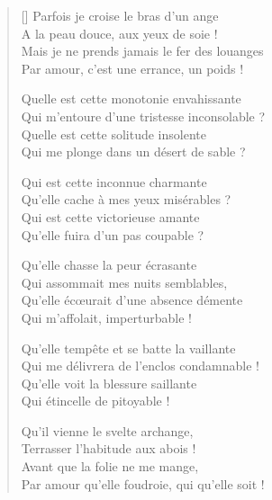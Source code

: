 \settowidth{\versewidth}{Qu'elle râle, se fasse entendre, mon introuvable !}
\begin{verse}[\versewidth]
Parfois je croise le bras d'un ange \\
A la peau douce, aux yeux de soie ! \\
Mais je ne prends jamais le fer des louanges \\
Par amour, c'est une errance, un poids !

Quelle est cette monotonie envahissante \\
Qui m'entoure d'une tristesse inconsolable ? \\
Quelle est cette solitude insolente \\
Qui me plonge dans un désert de sable ?

Qui est cette inconnue charmante \\
Qu'elle cache à mes yeux misérables ? \\
Qui est cette victorieuse amante \\
Qu'elle fuira d'un pas coupable ?

Qu'elle chasse la peur écrasante \\
Qui assommait mes nuits semblables, \\
Qu'elle écœurait d'une absence démente \\
Qui m'affolait, imperturbable !


Qu'elle tempête et se batte la vaillante \\
Qui me délivrera de l'enclos condamnable ! \\
Qu'elle voit la blessure saillante \\
Qui étincelle de pitoyable !

Qu'il vienne le svelte archange, \\
Terrasser l'habitude aux abois ! \\
Avant que la folie ne me mange, \\
Par amour qu'elle foudroie, qui qu'elle soit !
\end{verse}

\newpage

